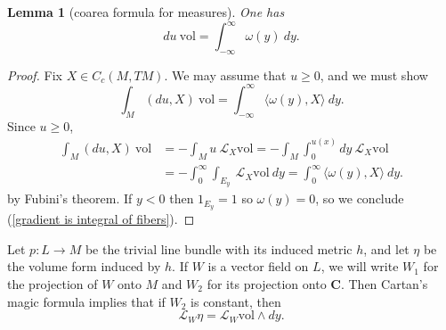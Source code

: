 \documentclass[reqno,12pt,letterpaper]{amsart}
\newcommand{\CC}{\mathbf{C}}
\newcommand{\vol}{\mathrm{vol}}
\newtheorem{lemma}[theorem]{Lemma}
\theoremstyle{definition}
\numberwithin{equation}{section}
\begin{document}
\begin{lemma}[coarea formula for measures]\label{Coarea1}
One has
$$du ~\vol = \int_{-\infty}^\infty \omega(y) ~dy.$$
\end{lemma}
\begin{proof}
Fix $X \in C_c(M, TM)$. We may assume that $u \geq 0$, and we must show
\begin{equation}
\label{gradient is integral of fibers}
\int_M (du, X) ~\vol = \int_{-\infty}^\infty \langle \omega(y), X\rangle ~dy.
\end{equation}
Since $u \geq 0$,
\begin{align*}
\int_M (du, X) ~\vol &= -\int_M u~\mathcal L_X\vol = -\int_M \int_0^{u(x)} dy ~\mathcal L_X\vol\\
&= -\int_0^\infty \int_{E_y} ~\mathcal L_X\vol ~dy = \int_0^\infty \langle \omega(y), X\rangle ~dy.
\end{align*}
by Fubini's theorem.
If $y < 0$ then $1_{E_y} = 1$ so $\omega(y) = 0$, so we conclude (\ref{gradient is integral of fibers}).
\end{proof}

Let $p: L \to M$ be the trivial line bundle with its induced metric $h$, and let $\eta$ be the volume form induced by $h$.
If $W$ is a vector field on $L$, we will write $W_1$ for the projection of $W$ onto $M$ and $W_2$ for its projection onto $\CC$.
Then Cartan's magic formula implies that if $W_2$ is constant, then
\begin{equation}
\label{Lie derivative computation}
\mathcal L_W\eta = \mathcal L_W\vol \wedge dy.
\end{equation}
\end{document}
